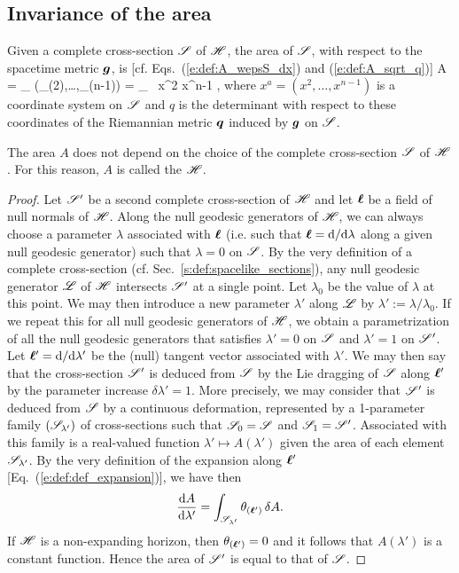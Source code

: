 \subsection{Invariance of the area} \label{s:neh:invar_area}

Given a complete cross-section $\mathscr{S}$ of $\mathscr{H}$, the area of $\mathscr{S}$, with respect to the spacetime metric $\bm{g}$, is [cf. Eqs.~(\ref{e:def:A_wepsS_dx}) and (\ref{e:def:A_sqrt_q})]
\be \label{e:neh:total_area}
    A = \int_{\Sp} \wepsS(\D{}_{(2)},\ldots,\D{}_{(n-1)})
        = \int_{\Sp}  \, \D x^2 \cdots \D x^{n-1} ,
\ee
where $x^a = (x^2, \ldots, x^{n-1})$ is a coordinate system on $\mathscr{S}$ and $q$ is
the determinant with respect to these coordinates of the Riemannian metric $\bm{q}$
induced by $\bm{g}$ on $\mathscr{S}$.

\begin{prop}
\label{p:neh:invariance_area}
The area $A$ does not depend on the choice of the complete cross-section $\mathscr{S}$
of $\mathscr{H}$.
For this reason, $A$ is
called the 
$\mathscr{H}$.
\end{prop}

\begin{proof}
Let $\mathscr{S}'$ be a second complete cross-section of $\mathscr{H}$ and let $\bm{\ell}$ be a field of null normals
of $\mathscr{H}$. Along the null geodesic generators of $\mathscr{H}$, we can always choose a parameter $\lambda$ associated with $\bm{\ell}$ (i.e. such that $\bm{\ell} = \mathrm{d}/\mathrm{d}\lambda$ along a given null geodesic generator)
such that $\lambda=0$ on $\mathscr{S}$. By the very definition of a complete cross-section
(cf. Sec.~\ref{s:def:spacelike_sections}),
any null geodesic generator $\mathscr{L}$ of $\mathscr{H}$ intersects $\mathscr{S}'$ at a single point. Let
$\lambda_0$ be the value of $\lambda$ at this point. We may then introduce
a new parameter $\lambda'$ along $\mathscr{L}$ by $\lambda' := \lambda/\lambda_0$.
If we repeat this for all null geodesic generators of $\mathscr{H}$, we obtain a parametrization
of all the null geodesic generators that satisfies $\lambda'=0$ on $\mathscr{S}$ and $\lambda'=1$
on $\mathscr{S}'$. Let $\bm{\ell}'=\mathrm{d}/\mathrm{d}\lambda'$ be the (null) tangent vector associated
with $\lambda'$. We may then say that the cross-section $\mathscr{S}'$ is deduced
from $\mathscr{S}$ by the Lie dragging of $\mathscr{S}$ along $\bm{\ell}'$ by the parameter increase $\delta\lambda'=1$.
More precisely, we may consider that $\mathscr{S}'$ is deduced from $\mathscr{S}$ by a
continuous deformation, represented by a 1-parameter family $(\mathscr{S}_{\lambda'})$
of cross-sections such that $\mathscr{S}_0 = \mathscr{S}$ and $\mathscr{S}_1 = \mathscr{S}'$. Associated
with this family is a real-valued function $\lambda' \mapsto A(\lambda')$
given the area of each element $\mathscr{S}_{\lambda'}$. By the very definition
of the expansion along $\bm{\ell}'$ [Eq.~(\ref{e:def:def_expansion})], we have then
\[
    \frac{\mathrm{d} A}{\mathrm{d}\lambda'} = \int_{\mathscr{S}_{\lambda'}} \theta_{(\bm{\ell}')} \, \delta A .
\]
If $\mathscr{H}$ is a non-expanding horizon, then $\theta_{(\bm{\ell}')}=0$ and it follows
that $A(\lambda')$ is a constant function. Hence the area of $\mathscr{S}'$ is equal
to that of $\mathscr{S}$.
\end{proof}

